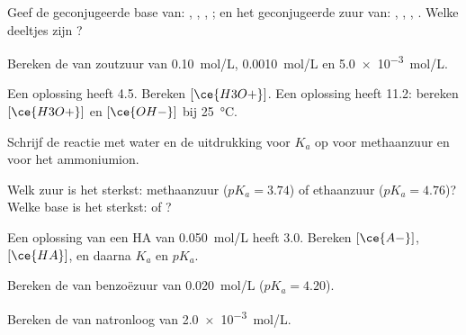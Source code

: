 \begin{exercise}[$\star$]\label{exo:g12:ka-and-pka:1}
Geef de geconjugeerde base van: , , ,
; en het geconjugeerde zuur van: , , ,
. Welke deeltjes zijn ?
\end{exercise}

\begin{exercise}[$\star$]\label{exo:g12:ka-and-pka:2}
Bereken de  van zoutzuur van \qty{0.10}{mol/L},
\qty{0.0010}{mol/L} en \qty{5.0e-3}{mol/L}.
\end{exercise}

\begin{exercise}[$\star$]\label{exo:g12:ka-and-pka:3}
Een oplossing heeft  4.5. Bereken $[\ce{H3O+}]$. Een oplossing heeft
 11.2: bereken $[\ce{H3O+}]$ en $[\ce{OH-}]$ bij \qty{25}{\celsius}.
\end{exercise}

\begin{exercise}[$\star$]\label{exo:g12:ka-and-pka:4}
Schrijf de reactie met water en de uitdrukking voor $K_a$ op voor
methaanzuur en voor het ammoniumion.
\end{exercise}

\begin{exercise}[$\star$]\label{exo:g12:ka-and-pka:5}
Welk zuur is het sterkst: methaanzuur ($pK_a = 3.74$) of ethaanzuur
($pK_a = 4.76$)? Welke base is het sterkst:  of
?
\end{exercise}

\begin{exercise}[$\star\star$]\label{exo:g12:ka-and-pka:6}
Een oplossing van een  HA van \qty{0.050}{mol/L} heeft  3.0.
Bereken $[\ce{A-}]$, $[\ce{HA}]$, en daarna $K_a$ en $pK_a$.
\end{exercise}

\begin{exercise}[$\star\star$]\label{exo:g12:ka-and-pka:7}
Bereken de  van benzoëzuur van \qty{0.020}{mol/L} ($pK_a = 4.20$).
\end{exercise}

\begin{exercise}[$\star\star$]\label{exo:g12:ka-and-pka:8}
Bereken de  van natronloog van \qty{2.0e-3}{mol/L}.
\end{exercise}


